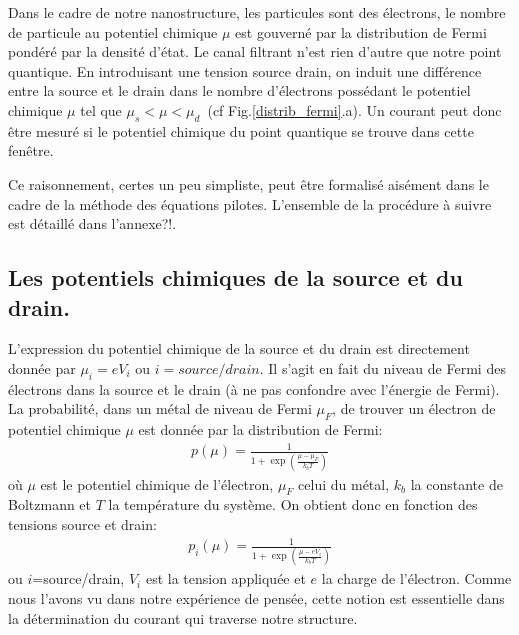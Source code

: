 Dans le cadre de notre nanostructure, les particules sont des électrons, le nombre de particule au potentiel chimique $\mu$ est gouverné par la distribution de Fermi pondéré par la densité d'état. Le canal filtrant n'est rien d'autre que notre point quantique. En introduisant une tension source drain, on induit une différence entre la source et le drain dans le nombre d'électrons possédant le potentiel chimique $\mu$ tel que $\mu_s < \mu < \mu_d$~(cf Fig.\ref{distrib_fermi}.a). Un courant peut donc \^etre mesuré si le potentiel chimique du point quantique se trouve dans cette fen\^etre.

Ce raisonnement, certes un peu simpliste, peut \^etre formalisé aisément dans le cadre de la méthode des équations pilotes. L'ensemble de la procédure à suivre est détaillé dans l'annexe?!.



\subsection{Les potentiels chimiques de la source et du drain.}
L'expression du potentiel chimique de la source et du drain est directement donnée par $\mu_i = e V_i$ ou $i=source/drain$. Il s'agit en fait du niveau de Fermi des électrons dans la source et le drain (à ne pas confondre avec l'énergie de Fermi). La probabilité, dans un métal de niveau de Fermi $\mu_F$, de trouver un électron de potentiel chimique $\mu$ est donnée par la distribution de Fermi:
\begin{eqnarray}
p(\mu) = \frac{1}{1 + \exp{(\frac{\mu - \mu_F}{k_bT})}} \nonumber
\end{eqnarray}
où $\mu$ est le potentiel chimique de l'électron, $\mu_F$ celui du métal, $k_b$ la constante de Boltzmann et $T$ la température du système. On obtient donc en fonction des tensions source et drain:
\begin{eqnarray}
p_i(\mu) = \frac{1}{1 + \exp{(\frac{\mu - eV_i}{k_bT})}}
\end{eqnarray}
ou $i$=source/drain, $V_i$ est la tension appliquée et $e$ la charge de l'électron. Comme nous l'avons vu dans notre expérience de pensée, cette notion est essentielle dans la détermination du courant qui traverse notre structure.

